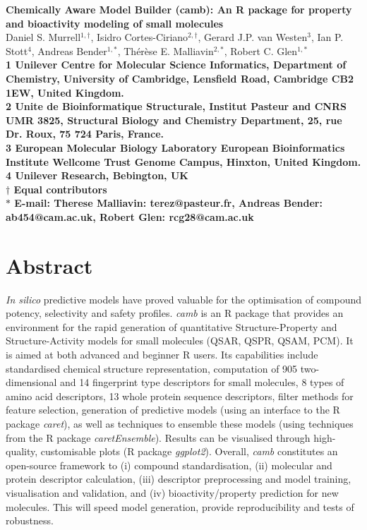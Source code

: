 \documentclass[twoside,a4wide,10pt]{article}
\date{}
\begin{document}
\begin{flushleft}
{\Large
\textbf{Chemically Aware Model Builder (camb): An R package for property and bioactivity modeling of small molecules}
}
\\

Daniel S. Murrell$^{1,\dag}$,
Isidro Cortes-Ciriano$^{2,\dag}$,
Gerard J.P. van Westen$^{3}$,
Ian P. Stott$^{4}$,
Andreas Bender$^{1,\ast}$,
Th\'er\`ese E. Malliavin$^{2,\ast}$,
Robert C. Glen$^{1,\ast}$\\

\bf{1} Unilever Centre for Molecular Science Informatics, Department of Chemistry, University of Cambridge, Lensfield Road, Cambridge CB2 1EW, United Kingdom.
\\
\bf{2} Unite de Bioinformatique Structurale, Institut Pasteur and CNRS UMR 3825, Structural Biology and Chemistry Department, 25, rue Dr. Roux, 75 724 Paris, France.
\\
\bf{3} European Molecular Biology Laboratory European Bioinformatics Institute Wellcome Trust Genome Campus, Hinxton, United Kingdom.
\\
\bf{4} Unilever Research, Bebington, UK
\\
$\dag$ Equal contributors\\
$\ast$ E-mail: Therese Malliavin: terez@pasteur.fr, Andreas Bender: ab454@cam.ac.uk, Robert Glen: rcg28@cam.ac.uk


\end{flushleft}







\section*{Abstract}

{\it In silico} predictive models have proved valuable for the optimisation of compound potency, selectivity and safety profiles.
{\it camb} is an R package that provides an environment for the rapid generation of quantitative Structure-Property and Structure-Activity models for small molecules (QSAR, QSPR, QSAM, PCM). 
It is aimed at both advanced and beginner R users.
Its capabilities include standardised chemical structure representation, computation of 905 two-dimensional and 14 fingerprint type descriptors for small molecules, 8 types of amino acid descriptors, 13 whole protein sequence descriptors, filter methods for feature selection, 
generation of predictive models (using an interface to the R package {\it caret}), as well as techniques to ensemble these models (using techniques from the R package {\it caretEnsemble}).
Results can be visualised through high-quality, customisable plots (R package {\it ggplot2}).
Overall, {\it camb} constitutes an open-source framework to
(i) compound standardisation, (ii) molecular and protein descriptor calculation, 
(iii) descriptor preprocessing and model training, visualisation and validation, 
and (iv) bioactivity/property prediction for new molecules.
This will speed model generation, provide reproducibility and tests of robustness. 
\end{document}
